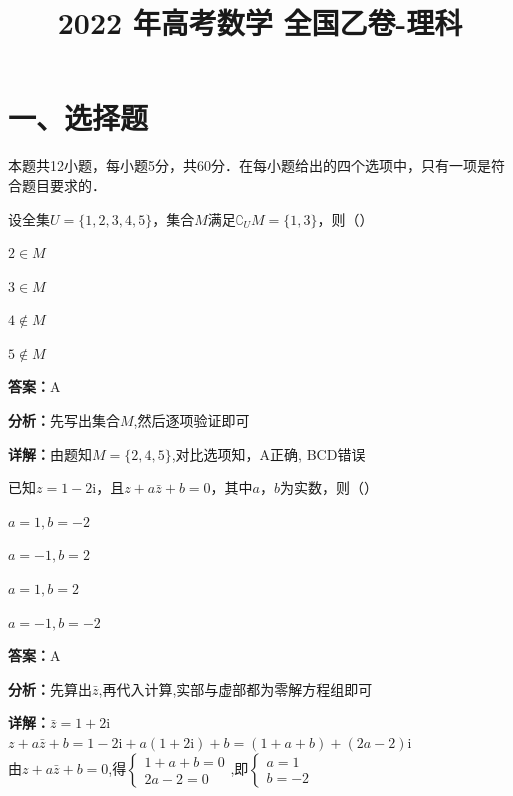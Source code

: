 ﻿\title{2022 年高考数学 全国乙卷-理科}
\date{}
\maketitle

\section*{一、选择题}
本题共12小题，每小题5分，共60分．在每小题给出的四个选项中，只有一项是符合题目要求的．

\begin{question}[points=5]
设全集$U = \{1, 2, 3, 4, 5\}$，集合$M$满足$\complement_U M = \{1, 3\}$，则（\qquad）
\begin{choices}
  \item $2 \in M$
  \item $3 \in M$
  \item $4 \notin M$
  \item $5 \notin M$
\end{choices}
\begin{solution}
\textbf{答案：}A

\textbf{分析：}先写出集合$M$,然后逐项验证即可

\textbf{详解：}由题知$M = \{2, 4, 5\}$,对比选项知，A正确, BCD错误
\end{solution}
\end{question}

\begin{question}[points=5]
已知$z = 1 - 2\mathrm{i}$，且$z + a\bar{z} + b = 0$，其中$a$，$b$为实数，则（\qquad）
\begin{choices}
  \item $a = 1, b = -2$
  \item $a = -1, b = 2$
  \item $a = 1, b = 2$
  \item $a = -1, b = -2$
\end{choices}
\begin{solution}
\textbf{答案：}A

\textbf{分析：}先算出$\bar{z}$,再代入计算,实部与虚部都为零解方程组即可

\textbf{详解：}$\bar{z} = 1 + 2\mathrm{i}$\\$z + a\bar{z} + b = 1 - 2\mathrm{i} + a(1 + 2\mathrm{i}) + b = (1 + a + b) + (2a - 2)\mathrm{i}$\\由$z + a\bar{z} + b = 0$,得$\begin{cases} 1 + a + b = 0 \\ 2a - 2 = 0 \end{cases}$,即$\begin{cases} a = 1 \\ b = -2 \end{cases}$
\end{solution}
\end{question}

